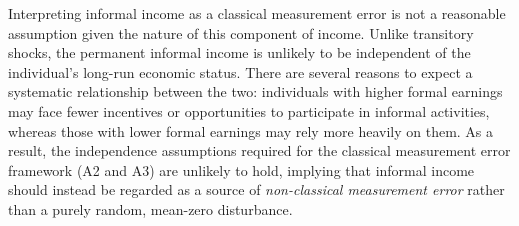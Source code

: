 Interpreting informal income as a classical measurement error is not a reasonable assumption given the nature of this component of income.  
Unlike transitory shocks, the permanent informal income is unlikely to be independent of the individual’s long-run economic status.  
There are several reasons to expect a systematic relationship between the two: individuals with higher formal earnings may face fewer incentives or opportunities to participate in informal activities, whereas those with lower formal earnings may rely more heavily on them.  
As a result, the independence assumptions required for the classical measurement error framework (A2 and A3) are unlikely to hold, implying that informal income should instead be regarded as a source of \textit{non-classical measurement error} rather than a purely random, mean-zero disturbance.


